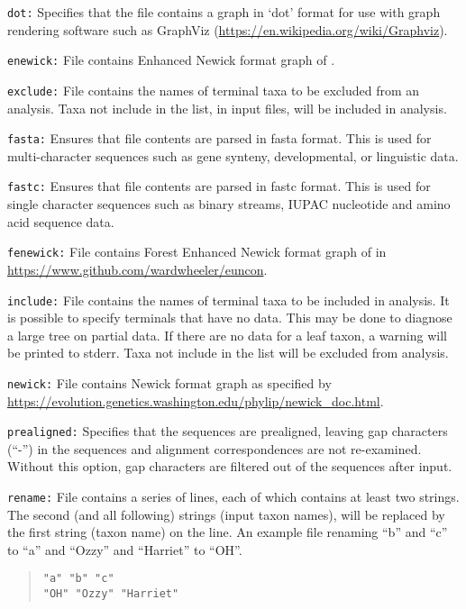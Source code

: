 \documentclass[11pt]{article}
\begin{document}
			\noindent \texttt{dot:} Specifies that the file contains a graph in `dot' format for use with graph rendering software such as GraphViz (\url{https://en.wikipedia.org/wiki/Graphviz}).
			
			\smallskip		
			\noindent \texttt{enewick:} File contains Enhanced Newick format graph of \cite{Cardonaetal2008}.
			
			\smallskip		
			\noindent \texttt{exclude:}  File contains the names of terminal taxa to be excluded from an analysis.  Taxa not include in the list, in input files, will be included in analysis. 
			
			\smallskip		
			\noindent \texttt{fasta:} Ensures that file contents are parsed in fasta \citep{WheelerandWashburn2019} format. This is used for multi-character sequences such as gene synteny, developmental,  or linguistic  data.
		
			\smallskip		
			\noindent \texttt{fastc:} Ensures that file contents are parsed in fastc \citep{PearsonandLipman1988} format. This is used for single character sequences such as binary streams, IUPAC nucleotide and amino acid sequence data.
			
			\smallskip		
			\noindent \texttt{fenewick:}  File contains Forest Enhanced Newick format graph of \cite{Wheeler2021a} in \url{https://www.github.com/wardwheeler/euncon}.
			
			\smallskip		
			\noindent \texttt{include:}  File contains the names of terminal taxa to be included in analysis.  It is possible to specify terminals that have no data.  This may be done to diagnose a large tree on partial data.  If there are no data for a leaf taxon, a warning will be printed to stderr.  Taxa not include in the list will be excluded from analysis. 
			
			\smallskip		
			\noindent \texttt{newick:} File contains  Newick format graph as specified by \url{https://evolution.genetics.washington.edu/phylip/newick_doc.html}.
			
			\smallskip		
			\noindent \texttt{prealigned:} Specifies that the sequences are prealigned, leaving gap characters
			(``-'') in the sequences and alignment correspondences are not re-examined. Without this option,
			gap characters are filtered out of the sequences after input.
			
			\smallskip		
			\noindent \texttt{rename:} File contains a series of lines, each of which contains at least two strings.  The second (and all following) strings (input taxon names),
			will be replaced by the first string (taxon name) on the line. An example file renaming ``b'' and ``c''  to ``a'' and ``Ozzy'' and ``Harriet'' to ``OH''.
				\begin{quote}
				\texttt{"a" "b" "c"}\\
				\texttt{"OH" "Ozzy" "Harriet"}
			\end{quote}
		
\end{document}
